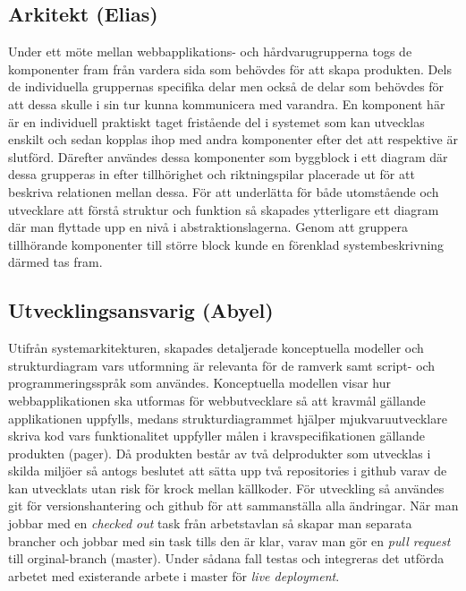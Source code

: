 \documentclass[conference]{IEEEtran}
\begin{document}
\subsection{Arkitekt (Elias)}
Under ett möte mellan webbapplikations- och hårdvarugrupperna togs de komponenter fram från vardera sida som behövdes för att skapa produkten. Dels de individuella gruppernas specifika delar men också de delar som behövdes för att dessa skulle i sin tur kunna kommunicera med varandra. En komponent här är en individuell praktiskt taget fristående del i systemet som kan utvecklas enskilt och sedan kopplas ihop med andra komponenter efter det att respektive är slutförd. Därefter användes dessa komponenter som byggblock i ett diagram där dessa grupperas in efter tillhörighet och riktningspilar placerade ut för att beskriva relationen mellan dessa. För att underlätta för både utomstående och utvecklare att förstå struktur och funktion så skapades ytterligare ett diagram där man flyttade upp en nivå i abstraktionslagerna. Genom att gruppera tillhörande komponenter till större block kunde en förenklad systembeskrivning därmed tas fram.

\subsection{Utvecklingsansvarig (Abyel)}
Utifrån systemarkitekturen, skapades detaljerade konceptuella modeller och strukturdiagram vars utformning är relevanta 
för de ramverk samt script- och programmeringsspråk som användes. Konceptuella modellen visar hur webbapplikationen ska utformas för webbutvecklare så att kravmål gällande applikationen uppfylls, medans strukturdiagrammet hjälper mjukvaruutvecklare skriva kod vars funktionalitet uppfyller målen i kravspecifikationen gällande produkten (pager). Då produkten 
består av två delprodukter som utvecklas i skilda miljöer så antogs beslutet att sätta upp två repositories i github varav de kan utvecklats 
utan risk för krock mellan källkoder. För utveckling så användes git för versionshantering och github för att sammanställa alla ändringar. 
När man jobbar med en \textit{checked out} task från arbetstavlan så skapar man separata brancher och jobbar med sin task tills den är klar, varav 
man gör en \textit{pull request} till orginal-branch (master). Under sådana fall testas och integreras det utförda arbetet med existerande arbete 
i master för \textit{live deployment}. 

\end{document}

